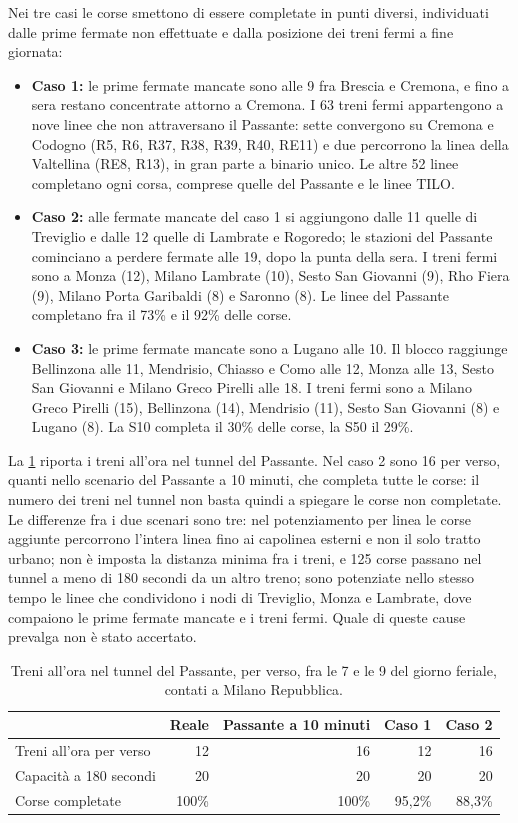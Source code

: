 Nei tre casi le corse smettono di essere completate in punti diversi, individuati dalle prime fermate non effettuate e dalla posizione dei treni fermi a fine giornata:
\begin{itemize}
	\item \textbf{Caso 1:} le prime fermate mancate sono alle 9 fra Brescia e Cremona, e fino a sera restano concentrate attorno a Cremona. I 63 treni fermi appartengono a nove linee che non attraversano il Passante: sette convergono su Cremona e Codogno (R5, R6, R37, R38, R39, R40, RE11) e due percorrono la linea della Valtellina (RE8, R13), in gran parte a binario unico. Le altre 52 linee completano ogni corsa, comprese quelle del Passante e le linee TILO.
	\item \textbf{Caso 2:} alle fermate mancate del caso 1 si aggiungono dalle 11 quelle di Treviglio e dalle 12 quelle di Lambrate e Rogoredo; le stazioni del Passante cominciano a perdere fermate alle 19, dopo la punta della sera. I treni fermi sono a Monza (12), Milano Lambrate (10), Sesto San Giovanni (9), Rho Fiera (9), Milano Porta Garibaldi (8) e Saronno (8). Le linee del Passante completano fra il 73\% e il 92\% delle corse.
	\item \textbf{Caso 3:} le prime fermate mancate sono a Lugano alle 10. Il blocco raggiunge Bellinzona alle 11, Mendrisio, Chiasso e Como alle 12, Monza alle 13, Sesto San Giovanni e Milano Greco Pirelli alle 18. I treni fermi sono a Milano Greco Pirelli (15), Bellinzona (14), Mendrisio (11), Sesto San Giovanni (8) e Lugano (8). La S10 completa il 30\% delle corse, la S50 il 29\%.
\end{itemize}

La \cref{tab:risultati-tunnel} riporta i treni all'ora nel tunnel del Passante. Nel caso 2 sono 16 per verso, quanti nello scenario del Passante a 10 minuti, che completa tutte le corse: il numero dei treni nel tunnel non basta quindi a spiegare le corse non completate. Le differenze fra i due scenari sono tre: nel potenziamento per linea le corse aggiunte percorrono l'intera linea fino ai capolinea esterni e non il solo tratto urbano; non è imposta la distanza minima fra i treni, e 125 corse passano nel tunnel a meno di 180 secondi da un altro treno; sono potenziate nello stesso tempo le linee che condividono i nodi di Treviglio, Monza e Lambrate, dove compaiono le prime fermate mancate e i treni fermi. Quale di queste cause prevalga non è stato accertato.

\begin{table}[H]
	\centering
	\caption{Treni all'ora nel tunnel del Passante, per verso, fra le 7 e le 9 del giorno feriale, contati a Milano Repubblica.}
	\label{tab:risultati-tunnel}
	\begin{tabularx}{\textwidth}{Xrrrr}
		\toprule
		 & Reale & Passante a 10 minuti & Caso 1 & Caso 2 \\
		\midrule
		Treni all'ora per verso & 12 & 16 & 12 & 16 \\
		Capacità a 180 secondi & 20 & 20 & 20 & 20 \\
		Corse completate & 100\% & 100\% & 95,2\% & 88,3\% \\
		\bottomrule
	\end{tabularx}
\end{table}

